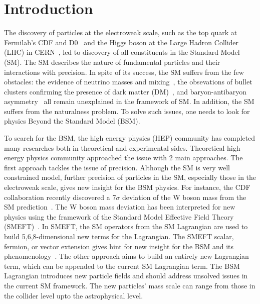 \chapter{Introduction}\label{sec:introduction}

The discovery of particles at the electroweak scale, such as the top quark at Fermilab's CDF and D0~\cite{topD0,topCDF} and the Higgs boson at the Large Hadron Collider (LHC) in CERN~\cite{higgscms,higgsatlas}, led to discovery of all constituents in the Standard Model (SM). 
The SM describes the nature of fundamental particles and their interactions with precision. 
In spite of its success, the SM suffers from the few obstacles:
the evidence of neutrino masses and mixing~\cite{neutrino}, the obsevations of bullet clusters confirming the presence of dark matter (DM)~\cite{Baumgart:2009tn,Kaplan:2009ag,Chan:2011aa,Dienes:2011ja,Dienes:2012yz}, and baryon-antibaryon asymmetry~\cite{Cui:2014twa} all remain unexplained in the framework of SM. 
In addition, the SM suffers from the naturalness problem. 
To solve such issues, one needs to look for physics Beyond the Standard Model (BSM).

To search for the BSM, the high energy physics (HEP) community has completed many researches both in theoretical and experimental sides. 
Theoretical high energy physics community approached the issue with 2 main approaches. 
The first approach tackles the issue of precision. 
Although the SM is very well constrained model, further precision of particles in the SM, especially those in the electroweak scale, gives new insight for the BSM physics.
For instance, the CDF collaboration recently discovered a 7$\sigma$ deviation of the W boson mass from the SM prediction~\cite{Aaltonen:2022aaa}. 
The W boson mass deviation has been interpreted for new physics using the framework of the Standard Model Effective Field Theory (SMEFT)~\cite{Mishima:2022aab}.
In SMEFT, the SM operators from the SM Lagrangian are used to build 5,6,8-dimensional new terms for the Lagrangian. 
The SMEFT scalar, fermion, or vector extension gives hint for new insight for the BSM and its phenomenology~\cite{Mishima:2022aab}.
The other approach aims to build an entirely new Lagrangian term, which can be appended to the current SM Lagrangian term. 
The BSM Lagrangian introduces new particle fields and should address unsolved issues in the current SM framework.
The new particles' mass scale can range from those in the collider level upto the astrophysical level.

